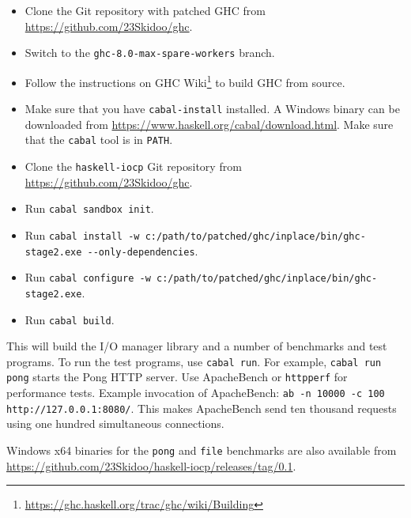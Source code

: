 \documentclass[a4paper,11pt,oneside]{report}
\begin{document}
\begin{itemize}
\item Clone the Git repository with patched GHC from
  \url{https://github.com/23Skidoo/ghc}.
\item Switch to the \texttt{ghc-8.0-max-spare-workers} branch.
\item Follow the instructions on GHC
  Wiki\footnote{\url{https://ghc.haskell.org/trac/ghc/wiki/Building}} to build
  GHC from source.
\item Make sure that you have \texttt{cabal-install} installed. A Windows binary
  can be downloaded from \url{https://www.haskell.org/cabal/download.html}. Make
  sure that the \texttt{cabal} tool is in \texttt{PATH}.
\item Clone the \texttt{haskell-iocp} Git repository from
  \url{https://github.com/23Skidoo/ghc}.
\item Run \texttt{cabal sandbox init}.
\item Run \texttt{cabal install -w c:/path/to/patched/ghc/inplace/bin/ghc-stage2.exe
    -{}-only-dependencies}.
\item Run \texttt{cabal configure -w c:/path/to/patched/ghc/inplace/bin/ghc-stage2.exe}.
\item Run \texttt{cabal build}.
\end{itemize}

This will build the I/O manager library and a number of benchmarks and test
programs. To run the test programs, use \texttt{cabal run}. For example,
\texttt{cabal run pong} starts the Pong HTTP server. Use ApacheBench or
\texttt{httpperf} for performance tests. Example invocation of ApacheBench:
\texttt{ab -n 10000 -c 100 http://127.0.0.1:8080/}. This makes ApacheBench send
ten thousand requests using one hundred simultaneous connections.

Windows x64 binaries for the \texttt{pong} and \texttt{file} benchmarks are also
available from \url{https://github.com/23Skidoo/haskell-iocp/releases/tag/0.1}.
\end{document}
